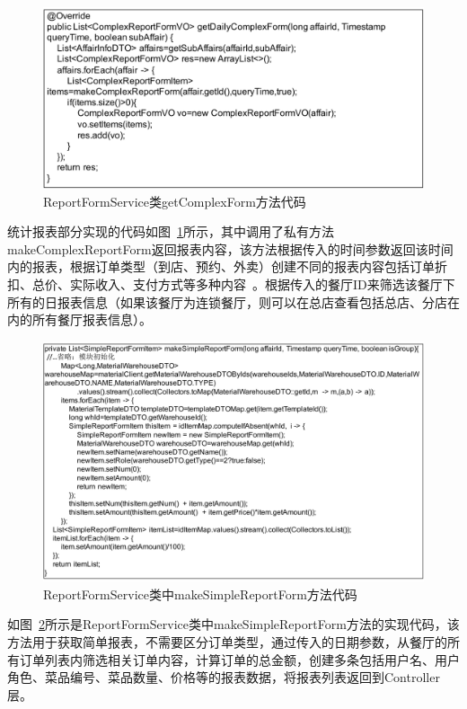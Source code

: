 \begin{figure}[htbp!]
    \centering
    \includegraphics[width=\linewidth]{FIGs/chapter4/6.pdf}
    \caption{ReportFormService类getComplexForm方法代码}\label{fig_table_6}
\end{figure}

统计报表部分实现的代码如图~\ref{fig_table_6}所示，其中调用了私有方法makeComplexReportForm返回报表内容，该方法根据传入的时间参数返回该时间内的报表，根据订单类型（到店、预约、外卖）创建不同的报表内容包括订单折扣、总价、实际收入、支付方式等多种内容~\cite{DBLP:conf/icisa/YangPSC13}。根据传入的餐厅ID来筛选该餐厅下所有的日报表信息（如果该餐厅为连锁餐厅，则可以在总店查看包括总店、分店在内的所有餐厅报表信息）。

\begin{figure}[htbp!]
    \centering
    \includegraphics[width=\linewidth]{FIGs/chapter4/7.pdf}
    \caption{ReportFormService类中makeSimpleReportForm方法代码}\label{fig_table_7}
\end{figure}

如图~\ref{fig_table_7}所示是ReportFormService类中makeSimpleReportForm方法的实现代码，该方法用于获取简单报表，不需要区分订单类型，通过传入的日期参数，从餐厅的所有订单列表内筛选相关订单内容，计算订单的总金额，创建多条包括用户名、用户角色、菜品编号、菜品数量、价格等的报表数据，将报表列表返回到Controller层。

